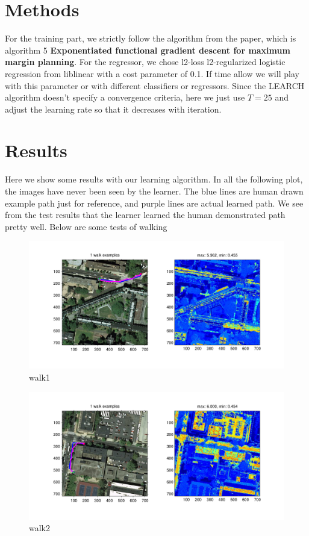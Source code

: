 \documentclass[twoside]{article}
\begin{document}
\begin{multicols}{2}
\section{Methods}
For the training part, we strictly follow the algorithm from the paper, which is algorithm 5 \textbf{Exponentiated functional gradient descent for maximum margin planning}.
For the regressor, we chose l2-loss l2-regularized logistic regression from liblinear with a cost parameter of 0.1. If time allow we will play with this parameter or with different classifiers or regressors.
Since the LEARCH algorithm doesn't specify a convergence criteria, here we just use $T=25$ and adjust the learning rate so that it decreases with iteration.


\section{Results}
Here we show some results with our learning algorithm. In all the following plot, the images have never been seen by the learner.
The blue lines are human drawn example path just for reference, and purple lines are actual learned path. We see from the test results that the learner learned the human demonstrated path pretty well.
Below are some tests of walking
\begin{figure}[H]
\centering
\includegraphics[width=\columnwidth]{fig/walk1.pdf}
\caption{walk1}
\label{fig:walk1}
\end{figure}

\begin{figure}[H]
\centering
\includegraphics[width=\columnwidth]{fig/walk2.pdf}
\caption{walk2}
\label{fig:walk2}
\end{figure}


\end{multicols}
\end{document}
